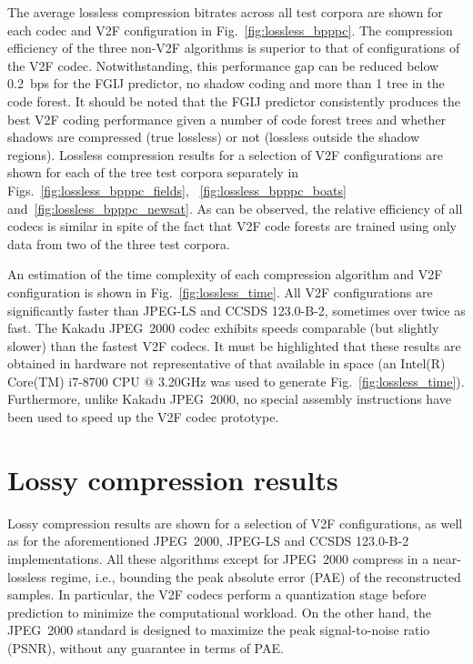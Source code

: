 \documentclass{class/technicalReportUAB}
\begin{document}
The average lossless compression bitrates across all test corpora are shown for each codec and V2F configuration in Fig.~\ref{fig:lossless_bpppc}.
The compression efficiency of the three non-V2F algorithms is superior to that of configurations of the V2F codec. Notwithstanding, this performance
gap can be reduced below 0.2~bps for the FGIJ predictor, no shadow coding and more than 1 tree in the code forest.
It should be noted that the FGIJ predictor consistently produces the best V2F coding performance given a number of code forest trees and 
whether shadows are compressed (true lossless) or not (lossless outside the shadow regions).
% 
Lossless compression results for a selection of V2F configurations are shown for each of the tree test corpora separately in Figs.~\ref{fig:lossless_bpppc_fields},
~\ref{fig:lossless_bpppc_boats} and~\ref{fig:lossless_bpppc_newsat}. As can be observed, the relative efficiency of all codecs is similar
in spite of the fact that V2F code forests are trained using only data from two of the three test corpora.


An estimation of the time complexity of each compression algorithm and V2F configuration is shown in Fig.~\ref{fig:lossless_time}. 
All V2F configurations are significantly faster than JPEG-LS and CCSDS 123.0-B-2, sometimes over twice as fast.
The Kakadu JPEG~2000 codec exhibits speeds comparable (but slightly slower) than the fastest V2F codecs.
% 
It must be highlighted that these results are obtained in hardware not representative of that available in space
(an Intel(R) Core(TM) i7-8700 CPU @ 3.20GHz was used to generate Fig.~\ref{fig:lossless_time}). Furthermore, unlike Kakadu JPEG~2000, 
no special assembly instructions have been used to speed up the V2F codec prototype.

\section{Lossy compression results}\label{sec:lossy_results}

Lossy compression results are shown for a selection of V2F configurations, as well as for the aforementioned JPEG~2000, JPEG-LS and CCSDS 123.0-B-2 implementations.
% 
All these algorithms except for JPEG~2000 compress in a near-lossless regime, i.e., bounding the peak absolute error (PAE) of the reconstructed samples.
In particular, the V2F codecs perform a quantization stage before prediction to minimize the computational workload.
On the other hand, the JPEG~2000 standard is designed to maximize the peak signal-to-noise ratio (PSNR), without any guarantee in terms of PAE.
\end{document}

